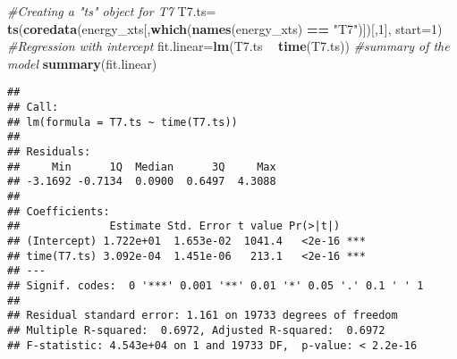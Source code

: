 \documentclass[]{article}
\newenvironment{Shaded}{\begin{snugshade}}{\end{snugshade}}
\newcommand{\KeywordTok}[1]{\textcolor[rgb]{0.13,0.29,0.53}{\textbf{#1}}}
\newcommand{\DataTypeTok}[1]{\textcolor[rgb]{0.13,0.29,0.53}{#1}}
\newcommand{\DecValTok}[1]{\textcolor[rgb]{0.00,0.00,0.81}{#1}}
\newcommand{\StringTok}[1]{\textcolor[rgb]{0.31,0.60,0.02}{#1}}
\newcommand{\CommentTok}[1]{\textcolor[rgb]{0.56,0.35,0.01}{\textit{#1}}}
\newcommand{\OperatorTok}[1]{\textcolor[rgb]{0.81,0.36,0.00}{\textbf{#1}}}
\newcommand{\NormalTok}[1]{#1}
\begin{document}
\begin{Shaded}
\begin{Highlighting}[]
\CommentTok{#Creating a "ts" object for T7}
\NormalTok{T7.ts=}\StringTok{ }\KeywordTok{ts}\NormalTok{(}\KeywordTok{coredata}\NormalTok{(energy_xts[,}\KeywordTok{which}\NormalTok{(}\KeywordTok{names}\NormalTok{(energy_xts) }\OperatorTok{==}\StringTok{ "T7"}\NormalTok{)])[,}\DecValTok{1}\NormalTok{], }\DataTypeTok{start=}\DecValTok{1}\NormalTok{)}
\CommentTok{#Regression with intercept}
\NormalTok{fit.linear=}\KeywordTok{lm}\NormalTok{(T7.ts }\OperatorTok{~}\StringTok{ }\KeywordTok{time}\NormalTok{(T7.ts))}
\CommentTok{#summary of the model}
\KeywordTok{summary}\NormalTok{(fit.linear)}
\end{Highlighting}
\end{Shaded}

\begin{verbatim}
## 
## Call:
## lm(formula = T7.ts ~ time(T7.ts))
## 
## Residuals:
##     Min      1Q  Median      3Q     Max 
## -3.1692 -0.7134  0.0900  0.6497  4.3088 
## 
## Coefficients:
##              Estimate Std. Error t value Pr(>|t|)    
## (Intercept) 1.722e+01  1.653e-02  1041.4   <2e-16 ***
## time(T7.ts) 3.092e-04  1.451e-06   213.1   <2e-16 ***
## ---
## Signif. codes:  0 '***' 0.001 '**' 0.01 '*' 0.05 '.' 0.1 ' ' 1
## 
## Residual standard error: 1.161 on 19733 degrees of freedom
## Multiple R-squared:  0.6972, Adjusted R-squared:  0.6972 
## F-statistic: 4.543e+04 on 1 and 19733 DF,  p-value: < 2.2e-16
\end{verbatim}

\begin{Shaded}
\end{Shaded}
\end{document}
